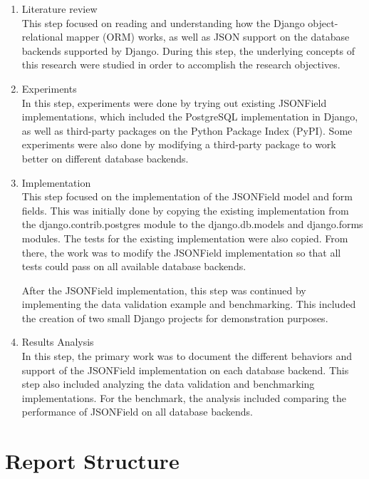 \begin{enumerate}
    \item Literature review \\
    This step focused on reading and understanding how the Django
    object-relational mapper (ORM) works, as well as JSON support on the
    database backends supported by Django. During this step, the underlying
    concepts of this research were studied in order to accomplish the research
    objectives.

    \item Experiments \\
    In this step, experiments were done by trying out existing JSONField
    implementations, which included the PostgreSQL implementation in Django,
    as well as third-party packages on the Python Package Index (PyPI). Some
    experiments were also done by modifying a third-party package to work
    better on different database backends.

    \item Implementation \\
    This step focused on the implementation of the JSONField model and form
    fields. This was initially done by copying the existing implementation
    from the django.contrib.postgres module to the django.db.models and
    django.forms modules. The tests for the existing implementation were also
    copied. From there, the work was to modify the JSONField implementation so
    that all tests could pass on all available database backends.

    After the JSONField implementation, this step was continued by implementing
    the data validation example and benchmarking. This included the creation of
    two small Django projects for demonstration purposes.

    \item Results Analysis \\
    In this step, the primary work was to document the different behaviors and
    support of the JSONField implementation on each database backend. This step
    also included analyzing the data validation and benchmarking
    implementations. For the benchmark, the analysis included comparing the
    performance of JSONField on all database backends.
\end{enumerate}

\section{Report Structure}

